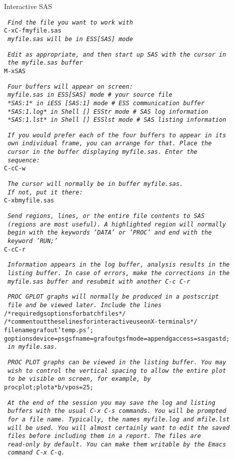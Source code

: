 \documentclass{article}
\newcommand*{\Scmt}[1]{\hbox{\qquad {\footnotesize \#\#} \textsl{#1}}}
\newenvironment{Salltt}{\small\begin{alltt}}{\end{alltt}}
\begin{document}
Interactive SAS

\begin{Salltt}
    \Scmt{Find the file you want to work with}
    C-x C-f myfile.sas
    \Scmt{myfile.sas will be in ESS[SAS] mode}

    \Scmt{Edit as appropriate, and then start up SAS with the cursor in}
    \Scmt{the myfile.sas buffer}
    M-x SAS

    \Scmt{Four buffers will appear on screen:}
    \Scmt{myfile.sas  in  ESS[SAS]        mode # your source file}
    \Scmt{*SAS:1*     in  iESS [SAS:1]    mode # ESS communication buffer}
    \Scmt{*SAS:1.log* in  Shell [] ESStr  mode # SAS log information}
    \Scmt{*SAS:1.lst* in  Shell [] ESSlst mode # SAS listing information}

    \Scmt{If you would prefer each of the four buffers to appear in its}
    \Scmt{own individual frame, you can arrange for that.  Place the}
    \Scmt{cursor in the buffer displaying myfile.sas.  Enter the}
    \Scmt{sequence:}
    C-c C-w

    \Scmt{The cursor will normally be in buffer myfile.sas.}
    \Scmt{If not, put it there:}
    C-x b myfile.sas

    \Scmt{Send regions, lines, or the entire file contents to SAS}
    \Scmt{(regions are most useful).  A highlighted region will normally}
    \Scmt{begin with the keywords 'DATA' or 'PROC' and end with the}
    \Scmt{keyword 'RUN;'}
    C-c C-r

    \Scmt{Information appears in the log buffer, analysis results in the}
    \Scmt{listing buffer.  In case of errors, make the corrections in the}
    \Scmt{myfile.sas buffer and resubmit with another C-c C-r}

    \Scmt{PROC GPLOT graphs will normally be produced in a postscript}
    \Scmt{file and be viewed later.  Include the lines}
    /* required gsoptions for batch files */
    /* comment out these lines for interactive use on X-terminals*/
    filename grafout 'temp.ps';
    goptions device=ps gsfname=grafout gsfmode=append gaccess=sasgastd;
    \Scmt{in myfile.sas.}

    \Scmt{PROC PLOT graphs can be viewed in the listing buffer.  You may}
    \Scmt{wish to control the vertical spacing to allow the entire plot}
    \Scmt{to be visible on screen, for example, by}
    proc plot; plot a*b / vpos=25;

    \Scmt{At the end of the session you may save the log and listing}
    \Scmt{buffers with the usual C-x C-s commands.  You will be prompted}
    \Scmt{for a file name.  Typically, the names myfile.log and mfile.lst}
    \Scmt{will be used.  You will almost certainly want to edit the saved}
    \Scmt{files before including them in a report.  The files are}
    \Scmt{read-only by default.  You can make them writable by the Emacs}
    \Scmt{command C-x C-q.}


\end{Salltt}
\end{document}

